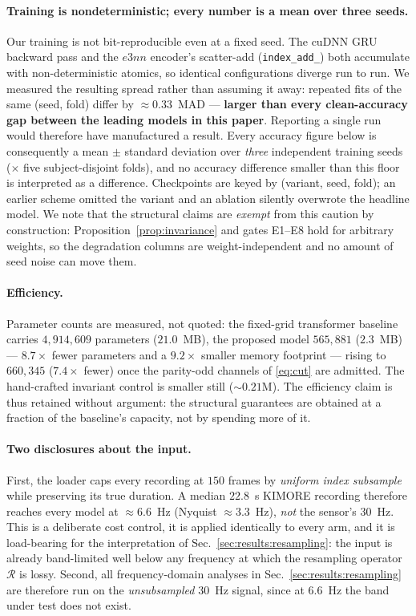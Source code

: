 \documentclass[10pt,journal]{IEEEtran}
\begin{document}
\paragraph{Training is nondeterministic; every number is a mean over three seeds.}
Our training is not bit-reproducible even at a fixed seed. The cuDNN GRU backward pass and the
$e3nn$ encoder's scatter-add (\texttt{index\_add\_}) both accumulate with non-deterministic atomics, so
identical configurations diverge run to run. We measured the resulting spread rather than assuming it
away: repeated fits of the same (seed, fold) differ by $\approx\!0.33$~MAD --- \textbf{larger than
every clean-accuracy gap between the leading models in this paper}. Reporting a single run would
therefore have manufactured a result. Every accuracy figure below is consequently a mean $\pm$ standard
deviation over \emph{three} independent training seeds ($\times$ five subject-disjoint folds), and no
accuracy difference smaller than this floor is interpreted as a difference. Checkpoints are keyed by
(variant, seed, fold); an earlier scheme omitted the variant and an ablation silently overwrote the
headline model. We note that the structural claims are \emph{exempt} from this caution by
construction: Proposition~\ref{prop:invariance} and gates E1--E8 hold for arbitrary weights, so the
degradation columns are weight-independent and no amount of seed noise can move them.

\paragraph{Efficiency.}
Parameter counts are measured, not quoted: the fixed-grid transformer baseline carries
$4{,}914{,}609$ parameters ($21.0$~MB), the proposed model $565{,}881$ ($2.3$~MB) --- $\mathbf{8.7\times}$
fewer parameters and a $\mathbf{9.2\times}$ smaller memory footprint --- rising to $660{,}345$
($7.4\times$ fewer) once the parity-odd channels of \eqref{eq:cut} are admitted. The hand-crafted
invariant control is smaller still ($\sim\!0.21$M). The efficiency claim is thus retained without
argument: the structural guarantees are obtained at a fraction of the baseline's capacity, not by
spending more of it.

\paragraph{Two disclosures about the input.}
First, the loader caps every recording at $150$ frames by \emph{uniform index subsample} while
preserving its true duration. A median $22.8$~s KIMORE recording therefore reaches every model at
$\approx\!6.6$~Hz (Nyquist $\approx\!3.3$~Hz), \emph{not} the sensor's $30$~Hz. This is a deliberate
cost control, it is applied identically to every arm, and it is load-bearing for the interpretation of
Sec.~\ref{sec:results:resampling}: the input is already band-limited well below any frequency at which
the resampling operator $\mathcal{R}$ is lossy. Second, all frequency-domain analyses in
Sec.~\ref{sec:results:resampling} are therefore run on the \emph{unsubsampled} $30$~Hz signal, since at
$6.6$~Hz the band under test does not exist.
\end{document}
